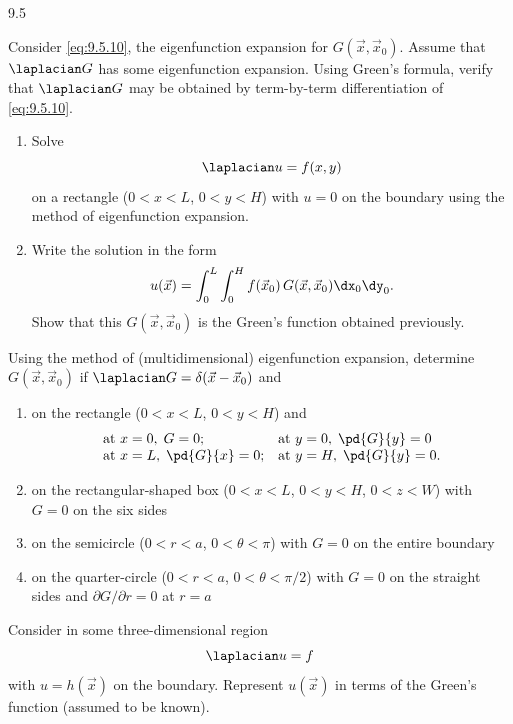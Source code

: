 \begin{exercises}{9.5}

\item Consider \eqref{eq:9.5.10}, the eigenfunction expansion for $G(\vec{x},\vec{x}_0)$.  Assume that $\laplacian G$ has some eigenfunction expansion.  Using Green's formula, verify that $\laplacian G$ may be obtained by term-by-term differentiation of \eqref{eq:9.5.10}.

\item
\begin{enumerate}
\item[(a)] Solve
\[
\laplacian u = f(x,y)
\]
on a rectangle ($0 < x < L$, $0 < y < H$) with $u = 0$ on the boundary using the method of eigenfunction expansion.
\item[(b)] Write the solution in the form
\[
u(\vec{x}) = \int_0^L\int_0^H f(\vec{x}_0)\,G(\vec{x},\vec{x}_0)\dx_0\dy_0.
\]
Show that this $G(\vec{x},\vec{x}_0)$ is the Green's function obtained previously.
\end{enumerate}

\item Using the method of (multidimensional) eigenfunction expansion, determine $G(\vec{x},\vec{x}_0)$ if $\laplacian G = \delta(\vec{x}-\vec{x}_0)$ and
\begin{enumerate}
\item[(a)] on the rectangle ($0 < x < L$, $0 < y < H$) and
\[
\begin{array}{ll}
\text{at } x=0,\; G=0; & \text{at } y=0,\; \pd{G}{y}=0 \\
\text{at } x=L,\; \pd{G}{x}=0; & \text{at } y=H,\; \pd{G}{y}=0.
\end{array}
\]
\item[(b)] on the rectangular-shaped box ($0 < x < L$, $0 < y < H$, $0 < z < W$) with $G = 0$ on the six sides
\item[\starred(c)] on the semicircle ($0 < r < a$, $0 < \theta < \pi$) with $G = 0$ on the entire boundary
\item[(d)] on the quarter-circle ($0 < r < a$, $0 < \theta < \pi/2$) with $G = 0$ on the straight sides and $\partial G/\partial r = 0$ at $r = a$
\end{enumerate}

\item[\starred 9.5.4.] Consider in some three-dimensional region
\[
\laplacian u = f
\]
with $u = h(\vec{x})$ on the boundary.  Represent $u(\vec{x})$ in terms of the Green's function (assumed to be known).


\end{exercises}
